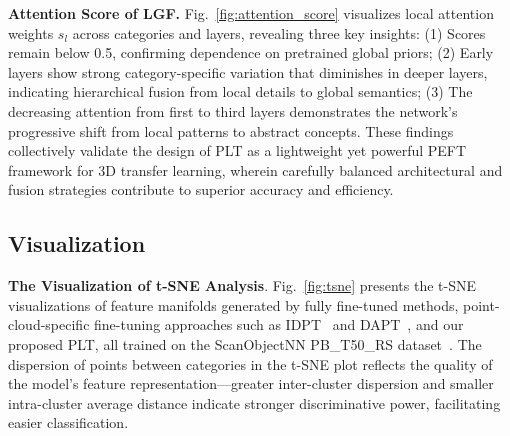 %

\textbf{Attention Score of LGF.} Fig.~\ref{fig:attention_score} visualizes local attention weights $s_l$ across categories and layers, revealing three key insights: (1) Scores remain below 0.5, confirming dependence on pretrained global priors; (2) Early layers show strong category-specific variation that diminishes in deeper layers, indicating hierarchical fusion from local details to global semantics; (3) The decreasing attention from first to third layers demonstrates the network's progressive shift from local patterns to abstract concepts.
These findings collectively validate the design of PLT as a lightweight yet powerful PEFT framework for 3D transfer learning, wherein carefully balanced architectural and fusion strategies contribute to superior accuracy and efficiency.



\subsection{Visualization}

\textbf{The Visualization of t-SNE Analysis}. Fig.~\ref{fig:tsne} presents the t-SNE~\cite{van2008visualizing} visualizations of feature manifolds generated by fully fine-tuned methods, point-cloud-specific fine-tuning approaches such as IDPT~\cite{zha2023instance} and DAPT~\cite{zhou2024dynamic}, and our proposed PLT, all trained on the ScanObjectNN PB\_T50\_RS dataset~\cite{uy2019revisiting}. The dispersion of points between categories in the t-SNE plot reflects the quality of the model's feature representation—greater inter-cluster dispersion and smaller intra-cluster average distance indicate stronger discriminative power, facilitating easier classification.

